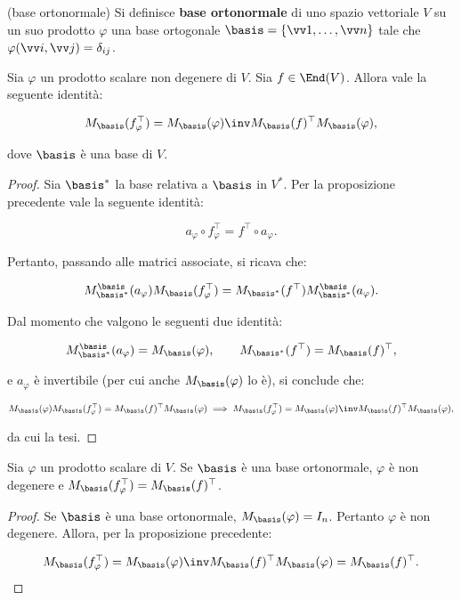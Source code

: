 \begin{definition} (base ortonormale)
	Si definisce \textbf{base ortonormale} di uno spazio vettoriale $V$ su un suo prodotto $\varphi$
	una base ortogonale $\basis = \{ \vv 1, \ldots, \vv n \}$ tale che $\varphi(\vv i, \vv j) = \delta_{ij}$.
\end{definition}

\begin{proposition}
	Sia $\varphi$ un prodotto scalare non degenere di $V$. Sia $f \in \End(V)$. Allora
	vale la seguente identità:
	
	\[ M_\basis(f_\varphi^\top) = M_\basis(\varphi)\inv M_\basis(f)^\top M_\basis(\varphi), \]
	
	dove $\basis$ è una base di $V$.
\end{proposition}

\begin{proof}
	Sia $\basis^*$ la base relativa a $\basis$ in $V^*$. Per la proposizione precedente vale la seguente identità:
	
	\[ a_\varphi \circ f_\varphi^\top = f^\top \circ a_\varphi. \]
	
	Pertanto, passando alle matrici associate, si ricava che:
	
	\[ M_{\basis^*}^\basis(a_\varphi) M_\basis(f_\varphi^\top) = M_{\basis^*}(f^\top) M_{\basis^*}^\basis(a_\varphi). \]
	
	Dal momento che valgono le seguenti due identità:
	
	\[ M_{\basis^*}^\basis(a_\varphi) = M_\basis(\varphi), \qquad M_{\basis^*}(f^\top) = M_\basis(f)^\top, \]
	
	e $a_\varphi$ è invertibile (per cui anche $M_\basis(\varphi)$ lo è), si conclude che:
	
	\[ M_\basis(\varphi) M_\basis(f_\varphi^\top) = M_\basis(f)^\top M_\basis(\varphi) \implies M_\basis(f_\varphi^\top) = M_\basis(\varphi)\inv M_\basis(f)^\top M_\basis(\varphi), \]
	
	da cui la tesi.
\end{proof}

\begin{corollary} Sia $\varphi$ un prodotto scalare di $V$.
	Se $\basis$ è una base ortonormale, $\varphi$ è non degenere e $M_\basis(f_\varphi^\top) = M_\basis(f)^\top$.
\end{corollary}

\begin{proof}
	Se $\basis$ è una base ortonormale, $M_\basis(\varphi) = I_n$. Pertanto $\varphi$ è
	non degenere. Allora, per la proposizione precedente:
	
	\[ M_\basis(f_\varphi^\top) = M_\basis(\varphi)\inv M_\basis(f)^\top M_\basis(\varphi) = M_\basis(f)^\top. \]
\end{proof}

